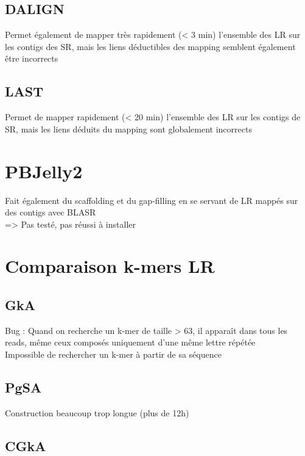 \documentclass[12pt]{article}
\begin{document}
\subsection{DALIGN}

Permet également de mapper très rapidement (< 3 min) l'ensemble des LR sur les contigs des SR, mais les liens déductibles des mapping semblent également
être incorrects

\subsection{LAST}

Permet de mapper rapidement (< 20 min) l'ensemble des LR sur les contigs de SR, mais les liens déduits du mapping sont globalement incorrects

\section{PBJelly2}

Fait également du scaffolding et du gap-filling en se servant de LR mappés sur des contigs avec BLASR \\
=> Pas testé, pas réussi à installer

\section{Comparaison k-mers LR}

\subsection{GkA}

Bug : Quand on recherche un k-mer de taille > 63, il apparaît dans tous les reads, même ceux composés uniquement d'une même lettre répétée \\

Impossible de rechercher un k-mer à partir de sa séquence \\

\subsection{PgSA}

Construction beaucoup trop longue (plus de 12h)

\subsection{CGkA}
\end{document}
